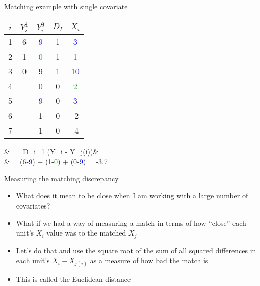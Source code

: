 \documentclass{beamer}
\begin{document}
	
\begin{frame}{Matching example with single covariate}
	
	\begin{table}
	\begin{tabular}{c|c|c|c|c}
	\hline
	$i$ & $Y^1_i$ & $Y^0_i$ & $D_I$ & $X_i$ \\
	\hline
	1 & 6 &  \textcolor{blue}{9} & 1 & \textcolor{blue}{3} \\
	2 & 1 &  \textcolor{green}{0} & 1 & \textcolor{green}{1} \\
	3 & 0 &   \textcolor{blue}{9} & 1 & \textcolor{blue}{10} \\
	\hline
	4 &  & \textcolor{green}{0} & 0 & \textcolor{green}{2} \\
	5 &  & \textcolor{blue}{9} & 0 & \textcolor{blue}{3} \\
	6 &  & 1 & 0 & -2 \\
	7 &  & 1 & 0 & -4 \\
	\hline
	\end{tabular}
	\end{table}
	
	
	\begin{flalign*}
		&= \sum_{D_i=1} (Y_i - Y_{j(i)})& \\
		& =  \cdot (6-\textcolor{blue}{9}) +  \cdot (1-\textcolor{green}{0}) +  \cdot (0-\textcolor{blue}{9}) = -3.7
	\end{flalign*}

\end{frame}


%



\begin{frame}{Measuring the matching discrepancy}

\begin{itemize}
\item What does it mean to be close when I am working with a large number of covariates?
\item What if we had a way of measuring a match in terms of how ``close'' each unit's $X_i$ value was to the matched $X_j$
\item Let's do that and use the square root of the sum of all squared differences in each unit's $X_i - X_{j(i)}$ as a measure of how bad the match is
\item This is called the Euclidean distance
\end{itemize}


\end{frame}
\end{document}
